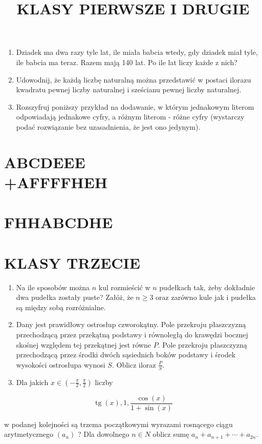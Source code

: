\documentclass[10pt]{article}
\title{KLASY PIERWSZE I DRUGIE }
\author{}
\date{}
\begin{document}
\maketitle
\begin{enumerate}
  \item Dziadek ma dwa razy tyle lat, ile miała babcia wtedy, gdy dziadek miał tyle, ile babcia ma teraz. Razem mają 140 lat. Po ile lat liczy każde z nich?
  \item Udowodnij, że każdą liczbę naturalną można przedstawić w postaci ilorazu kwadratu pewnej liczby naturalnej i sześcianu pewnej liczby naturalnej.
  \item Rozszyfruj poniższy przykład na dodawanie, w którym jednakowym literom odpowiadają jednakowe cyfry, a różnym literom - różne cyfry (wystarczy podać rozwiązanie bez uzasadnienia, że jest ono jedynym).
\end{enumerate}

\section*{ABCDEEE \\
 +AFFFFHEH}
\section*{FHHABCDHE}
\section*{KLASY TRZECIE}
\begin{enumerate}
  \item Na ile sposobów można \(n\) kul rozmieścić w \(n\) pudełkach tak, żeby dokładnie dwa pudełka zostały puste? Załóż, że \(n \geq 3\) oraz zarówno kule jak i pudełka są między sobą rozróżnialne.
  \item Dany jest prawidłowy ostrosłup czworokątny. Pole przekroju płaszczyzną przechodzącą przez przekątną podstawy i równoległą do krawędzi bocznej skośnej względem tej przekątnej jest równe \(P\). Pole przekroju płaszczyzną przechodzącą przez środki dwóch sąsiednich boków podstawy i środek wysokości ostrosłupa wynosi \(S\). Oblicz iloraz \(\frac{P}{S}\).
  \item Dla jakich \(x \in\left(-\frac{\pi}{2}, \frac{\pi}{2}\right)\) liczby
\end{enumerate}

\[
\operatorname{tg}(x), 1, \frac{\cos (x)}{1+\sin (x)}
\]

w podanej kolejności są trzema początkowymi wyrazami rosnącego ciągu arytmetycznego \(\left(a_{n}\right)\) ? Dla dowolnego \(n \in N\) oblicz sumę \(a_{n}+a_{n+1}+\cdots+a_{2 n}\).
\end{document}
